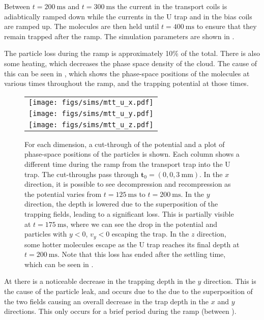 Between $t=\SI{200}{\milli\second}$ and $t=\SI{300}{\milli\second}$ the current
in the transport coils is adiabtically ramped down while the currents in
the U trap and in the bias coils are ramped up. The molecules are then held
until $t=\SI{400}{\milli\second}$ to ensure that they remain trapped after the
ramp. The simulation parameters are shown in
.


The particle loss during the ramp is approximately 10\% of the total. There is
also some heating, which decreases the phase space density of the cloud. The
cause of this can be seen in , which shows the
phase-space positions of the molecules at various times throughout the ramp,
and the trapping potential at those times.

\begin{figure}[p]
\centering
  \begin{tabular}{c}
    \texttt{[image: figs/sims/mtt\_u\_x.pdf]} \\
    \texttt{[image: figs/sims/mtt\_u\_y.pdf]} \\
    \texttt{[image: figs/sims/mtt\_u\_z.pdf]}
  \end{tabular}
  \caption{
    For each dimension, a cut-through of the potential and a plot of
    phase-space positions of the particles is shown. Each column shows a
    different time during the ramp from the transport trap into the U trap. The
    cut-throughs pass through $\mathbf{t}_0 = (0, 0, \SI{3}{\milli\meter})$. In
    the $x$ direction, it is possible to see decompression and recompression as
    the potential varies from $t=\SI{125}{\milli\second}$ to
    $t=\SI{200}{\milli\second}$. In the $y$ direction, the depth is lowered due
    to the superposition of the trapping fields, leading to a significant loss.
    This is partially visible at $t=\SI{175}{\milli\second}$, where we can see
    the drop in the potential and particles with $y<0$, $v_y<0$ escaping the
    trap. In the $z$ direction, some hotter molecules escape as the U trap
    reaches its final depth at $t=\SI{200}{\milli\second}$. Note that this loss
    has ended after the settling time, which can be seen in
    .
  }
  \label{design:fig:trans_U}
\end{figure}

At  there is a noticeable decrease in the trapping depth in the $y$
direction. This is the cause of the particle leak, and occurs due to the 
due to the superposition of the two fields causing an overall decrease in the
trap depth in the $x$ and $y$ directions. This only occurs for a brief period
during the ramp (between ). 

